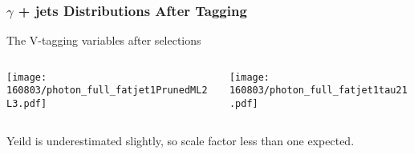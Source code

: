 \documentclass{beamer}
\begin{document}
\begin{frame}
  \frametitle{$\gamma$ + jets Distributions After Tagging}
  The V-tagging variables after selections
  \begin{columns}
    \begin{column}{0.5\linewidth}
      \centering
      \texttt{[image: 160803/photon\_full\_fatjet1PrunedML2L3.pdf]}
    \end{column}
    \begin{column}{0.5\linewidth}
      \centering
      \texttt{[image: 160803/photon\_full\_fatjet1tau21.pdf]}
    \end{column}
  \end{columns}
  Yeild is underestimated slightly, so scale factor less than one expected.
\end{frame}
\end{document}
